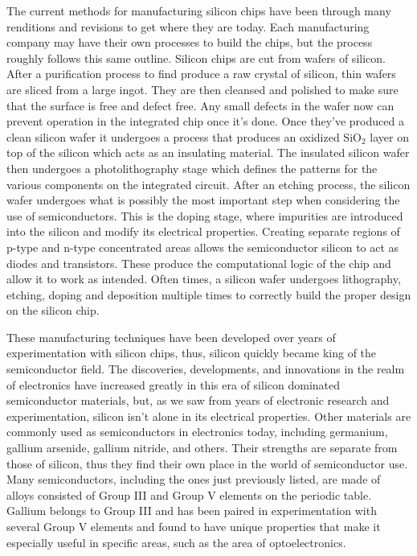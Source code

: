 \documentclass[12pt]{article}
\begin{document}
\begin{flushleft}
The current methods for manufacturing silicon chips
have been through many renditions and revisions to get
where they are today. Each manufacturing company may have
their own processes to build the chips, but the process
roughly follows this same outline. Silicon chips are
cut from wafers of silicon. After a purification process
to find produce a raw crystal of silicon, thin wafers
are sliced from a large ingot. They are then cleansed
and polished to make sure that the surface is free
and defect free. Any small defects in the wafer now
can prevent operation in the integrated chip once it's
done. Once they've produced a clean silicon wafer it
undergoes a process that produces an oxidized SiO$_2$
layer on top of the silicon which acts as an insulating
material. The insulated silicon wafer then undergoes
a photolithography stage which defines the patterns
for the various components on the integrated circuit.
After an etching process, the silicon wafer undergoes
what is possibly the most important step when considering
the use of semiconductors. This is the doping stage, where
impurities are introduced into the silicon and modify its
electrical properties. Creating separate regions of p-type
and n-type concentrated areas allows the semiconductor
silicon to act as diodes and transistors. These produce
the computational logic of the chip and allow it to
work as intended. Often times, a silicon wafer undergoes
lithography, etching, doping and deposition multiple
times to correctly build the proper design on the 
silicon chip.

These manufacturing techniques have been developed
over years of experimentation with silicon chips, thus,
silicon quickly became king of the semiconductor field.
The discoveries, developments, and innovations in the
realm of electronics have increased greatly in this
era of silicon dominated semiconductor materials, but,
as we saw from years of electronic research and experimentation,
silicon isn't alone in its electrical properties. Other
materials are commonly used as semiconductors in electronics
today, including germanium, gallium arsenide, gallium
nitride, and others. Their strengths are separate from
those of silicon, thus they find their own place in
the world of semiconductor use. Many semiconductors,
including the ones just previously listed, are made
of alloys consisted of Group III and Group V elements
on the periodic table. Gallium belongs to Group III
and has been paired in experimentation with several
Group V elements and found to have unique properties
that make it especially useful in specific areas, such
as the area of optoelectronics.


\end{flushleft}
\end{document}
